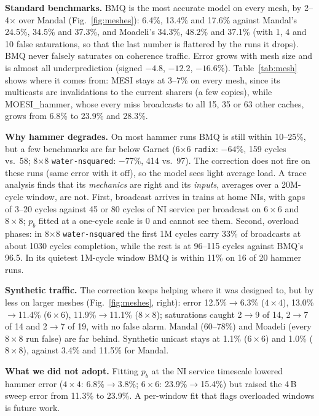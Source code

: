 \documentclass[conference]{IEEEtran}
\newcommand{\pb}{p_b}
\begin{document}
\textbf{Standard benchmarks.} BMQ is the most accurate model on every mesh, by 2--4$\times$ over Mandal (Fig.~\ref{fig:meshes}): 6.4\%, 13.4\% and 17.6\% against Mandal's 24.5\%, 34.5\% and 37.3\%, and Moadeli's 34.3\%, 48.2\% and 37.1\% (with 1, 4 and 10 false saturations, so that the last number is flattered by the runs it drops). BMQ never falsely saturates on coherence traffic. Error grows with mesh size and is almost all underprediction (signed $-4.8$, $-12.2$, $-16.6\%$). Table~\ref{tab:mesh} shows where it comes from: MESI stays at 3--7\% on every mesh, since its multicasts are invalidations to the current sharers (a few copies), while MOESI\_hammer, whose every miss broadcasts to all 15, 35 or 63 other caches, grows from 6.8\% to 23.9\% and 28.3\%.

\textbf{Why hammer degrades.} On most hammer runs BMQ is still within 10--25\%, but a few benchmarks are far below Garnet (6$\times$6 \texttt{radix}: $-64\%$, 159 cycles vs.\ 58; 8$\times$8 \texttt{water-nsquared}: $-77\%$, 414 vs.\ 97). The correction does not fire on these runs (same error with it off), so the model sees light average load. A trace analysis finds that its \emph{mechanics} are right and its \emph{inputs}, averages over a 20M-cycle window, are not. First, broadcast arrives in trains at home NIs, with gaps of 3--20 cycles against 45 or 80 cycles of NI service per broadcast on $6{\times}6$ and $8{\times}8$; $\pb$ fitted at a one-cycle scale is 0 and cannot see them. Second, overload phases: in 8$\times$8 \texttt{water-nsquared} the first 1M cycles carry 33\% of broadcasts at about 1030 cycles completion, while the rest is at 96--115 cycles against BMQ's 96.5. In its quietest 1M-cycle window BMQ is within 11\% on 16 of 20 hammer runs.

\textbf{Synthetic traffic.} The correction keeps helping where it was designed to, but by less on larger meshes (Fig.~\ref{fig:meshes}, right): error 12.5\%$\to$6.3\% ($4{\times}4$), 13.0\%$\to$11.4\% ($6{\times}6$), 11.9\%$\to$11.1\% ($8{\times}8$); saturations caught 2$\to$9 of 14, 2$\to$7 of 14 and 2$\to$7 of 19, with no false alarm. Mandal (60--78\%) and Moadeli (every $8{\times}8$ run false) are far behind. Synthetic unicast stays at 1.1\% ($6{\times}6$) and 1.0\% ($8{\times}8$), against 3.4\% and 11.5\% for Mandal.

\textbf{What we did not adopt.} Fitting $\pb$ at the NI service timescale lowered hammer error ($4{\times}4$: 6.8\%$\to$3.8\%; $6{\times}6$: 23.9\%$\to$15.4\%) but raised the 4\,B sweep error from 11.3\% to 23.9\%. A per-window fit that flags overloaded windows is future work.
\end{document}

